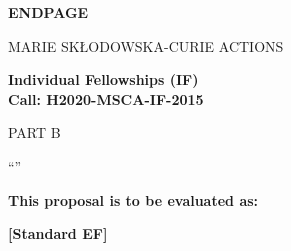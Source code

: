 \newpage
\vspace{15mm}
\begin{center}


        \Large{


        \textbf{ENDPAGE}

          \vspace{15mm}
          MARIE SK\L{}ODOWSKA-CURIE ACTIONS\\
          \vspace{1cm}

          \textbf{Individual Fellowships (IF)}\\
          \textbf{Call: H2020-MSCA-IF-2015}
          \vspace{2cm}

          PART B
          \vspace{2.5cm}

          ``\proposalAcronym''
          \vspace{2cm}

          \textbf{This proposal is to be evaluated as:}
          \vspace{.5cm}

          \textbf{[Standard EF]}
        }

  \end{center}
\vspace{1cm}
